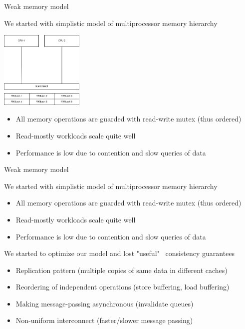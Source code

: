 \begin{frame}[t,fragile]{Weak memory model}

We started with simplistic model of multiprocessor memory hierarchy

\pause

\begin{center}
  \includegraphics[width=0.3\textwidth]{./pics/processor/5.png}
\end{center}

\pause
\begin{itemize}
    \item All memory operations are guarded with read-write mutex (thus ordered)
    \item Read-mostly workloads scale quite well
    \item Performance is low due to contention and slow queries of data
\end{itemize}
\end{frame}


\begin{frame}{Weak memory model}

We started with simplistic model of multiprocessor memory hierarchy
\begin{itemize}
    \item All memory operations are guarded with read-write mutex (thus ordered)
    \item Read-mostly workloads scale quite well
    \item Performance is low due to contention and slow queries of data
\end{itemize}

\pause 
We started to optimize our model and lost "useful" \ consistency guarantees
\begin{itemize}
    \pause
    \item Replication pattern (multiple copies of same data in different caches)
    \pause
    \item Reordering of independent operations (store buffering, load buffering)
    \pause
    \item Making message-passing asynchronous (invalidate queues)    
    \pause
    \item Non-uniform interconnect (faster/slower message passing)
\end{itemize}

\end{frame}



